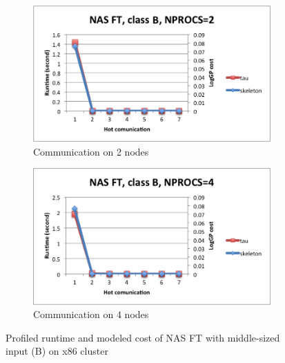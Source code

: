 \begin{figure}
{\scriptsize
\begin{subfigure}{.48\textwidth}
\centering
\includegraphics[width=.9\textwidth]{fig/blues/ft_B_2_model.png}
\caption{Communication on 2 nodes}
\label{fig:model:ft:B:2}
\end{subfigure}
\begin{subfigure}{.48\textwidth}
\centering
\includegraphics[width=.9\textwidth]{fig/blues/ft_B_4_model.png}
\caption{Communication on 4 nodes}
\label{fig::modelft:B:4}
\end{subfigure}
\caption{Profiled runtime and modeled cost of NAS FT with middle-sized input (B) on x86 cluster}
\label{fig:model:ft:B}
}%
\end{figure}

